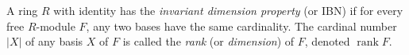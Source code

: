 A ring $R$ with identity has the \emph{invariant dimension property} (or IBN) if for every free $R$-module $F$, any two bases have the same cardinality. The cardinal number $|X|$ of any basis $X$ of $F$ is called the \emph{rank} (or \emph{dimension}) of $F$, denoted $\operatorname{rank} F$.
